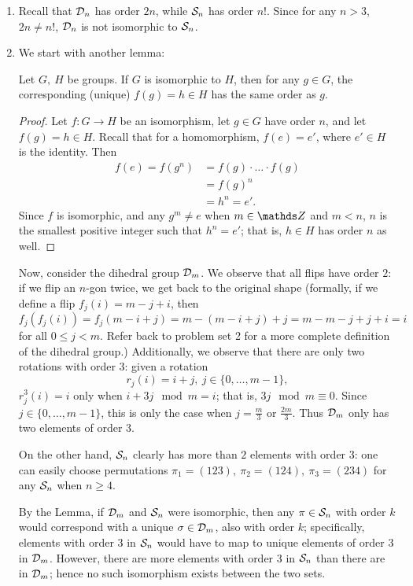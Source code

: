 \documentclass{homework}
\begin{document}
\begin{solution}
\begin{enumerate}[label=(\alph*)]
    \item Recall that $ \mathcal{D}_n$ has order $2n$, while $\mathcal{S}_n$ has order $n!$. Since for any $n>3$,
      $2n\neq n!$, $\mathcal{D}_n$  is not isomorphic to $\mathcal{S}_n$.
    \item We start with another lemma:
      \begin{lemma}[]{}
        Let $G,\ H$ be groups. If $G$ is isomorphic to $H$, then for any $g\in G$, the corresponding
        (unique) $f(g)=h\in H$ has the same order as $g$.
      \end{lemma}
      \begin{proof}[Proof]
        Let $f:G\to H$ be an isomorphism, let $g\in G$ have order $n$, and let $f(g)=h\in H$. Recall
        that for a homomorphism, $f(e)=e'$, where $e'\in H$ is the identity. Then
        \begin{align*}
          f(e)=f(g^{n})&= f(g)\cdot \ldots\cdot f(g) \\
                       &= f(g)^{n} \\
                       &= h^{n}=e'
        .\end{align*} Since $f$ is isomorphic, and any $g^{m}\neq e$ when $m\in \Z$ and $m<n$, $n$
        is the smallest positive integer such that $h^{n}=e'$; that is, $h\in  H$ has order $n$ as
        well.
      \end{proof}

      Now, consider the dihedral group $\mathcal{D}_m$. We observe that all flips have order $2$: if we flip
      an $n$-gon twice, we get back to the original shape (formally, if we define a flip
      $f_j(i)=m-j+i$, then $f_j(f_j(i))=f_j(m-i+j)=m-(m-i+j)+j=m-m-j+j+i=i$ for all $0\le j<m$.
      Refer back to problem set 2 for a more complete definition of the dihedral group.)
      Additionally, we observe that there are only two rotations with order 3: given a rotation \[
        r_j(i)=i+j,\ j\in \{0, \ldots, m-1\}
      ,\] $r_j^3(i)=i$ only when $i+3j\mod{m}=i$; that is, $3j\mod{m}\equiv 0$. Since $j\in
      \{0,\ldots,m-1\}$, this is only the case when $j=\frac{m}{3}$ or $\frac{2m}{3}$. Thus $\mathcal{D}_m$ 
      only has two elements of order $3$.

      On the other hand, $\mathcal{S}_n$ clearly has more than $2$ elements with order $3$: one can
      easily choose permutations $\pi_1=(123),\ \pi_2=(124),\ \pi_3=(234)$ for any $ \mathcal{S}_n$ when
      $n\ge 4$.

      By the Lemma, if $\mathcal{D}_m$ and $\mathcal{S}_n$ were isomorphic, then any $\pi\in \mathcal{S}_n$ with
      order $k$ would correspond with a unique $\sigma\in \mathcal{D}_m$, also with order $k$; specifically,
      elements with order 3 in $ \mathcal{S}_n$ would have to map to unique elements of order 3 in
      $\mathcal{D}_m$. However, there are more elements with order $3$ in $\mathcal{S}_n$ than there are in
      $\mathcal{D}_m$; hence no such isomorphism exists between the two sets.
      

\end{enumerate}
\end{solution}
\end{document}
